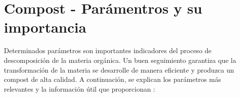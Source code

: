 

\section{Compost - Parámentros y su importancia}
\label{sec:CompostParámentros}

Determinados parámetros son importantes indicadores del proceso de descomposición de la materia orgánica. Un buen seguimiento garantiza que la transformación de la materia se desarrolle de manera eficiente y produzca un compost de alta calidad.
A continuación, se explican los parámetros más relevantes y la información útil que proporcionan \citep{ManualBuenasPracticas}:

